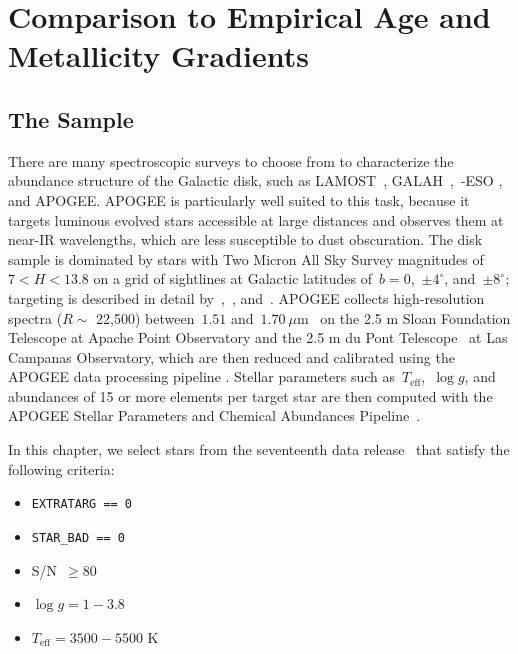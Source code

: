 
\section{Comparison to Empirical Age and Metallicity Gradients}
\label{outflows:sec:empirical}

\subsection{The Sample}
\label{outflows:sec:empirical:apogee}
There are many spectroscopic surveys to choose from to characterize the
abundance structure of the Galactic disk, such as
LAMOST~\citep{Luo2015}, GALAH~\citep{DeSilva2015, Martell2017},~\gaia-ESO
\citep{Gilmore2012}, and APOGEE\space\citep{Majewski2017}.
APOGEE is particularly well suited to this task, because it targets luminous
evolved stars accessible at large distances and observes them at near-IR
wavelengths, which are less susceptible to dust obscuration.
The disk sample is dominated by stars with Two Micron All Sky Survey
\citep{Skrutskie2006} magnitudes of~$7 < H < 13.8$ on a grid of sightlines at
Galactic latitudes of~$b = 0$,~$\pm 4^\circ$, and~$\pm 8^\circ$; targeting is
described in detail by~\citet{Zasowski2013, Zasowski2017},~\citet{Beaton2021},
and~\citet{Santana2021}.
APOGEE collects high-resolution spectra ($R \sim$ 22,500) between~$1.51$
and~$1.70~\mu$m~\citep{Wilson2019} on the 2.5 m Sloan Foundation Telescope
\citep{Gunn2006} at Apache Point Observatory and the 2.5 m du Pont
Telescope~\citep{Bowen1973} at Las Campanas Observatory, which are then
reduced and calibrated using the APOGEE data processing pipeline
\citep{Nidever2015}.
Stellar parameters such as~$T_\text{eff}$,~$\log g$, and abundances of 15 or
more elements per target star are then computed with the APOGEE Stellar
Parameters and Chemical Abundances Pipeline~\citep[ASPCAP;][]{Holtzman2015,
GarciaPerez2016}.
\par
In this chapter, we select stars from the seventeenth data
release~\citep[DR17;][]{Abdurrouf2022} that satisfy the following criteria:
\begin{itemize}

	\item \texttt{EXTRATARG == 0}

	\item \texttt{STAR\_BAD == 0}

	\item S/N~$\geq 80$

	\item $\log g = 1 - 3.8$

	\item $T_\text{eff} = 3500 - 5500$ K

\end{itemize}
